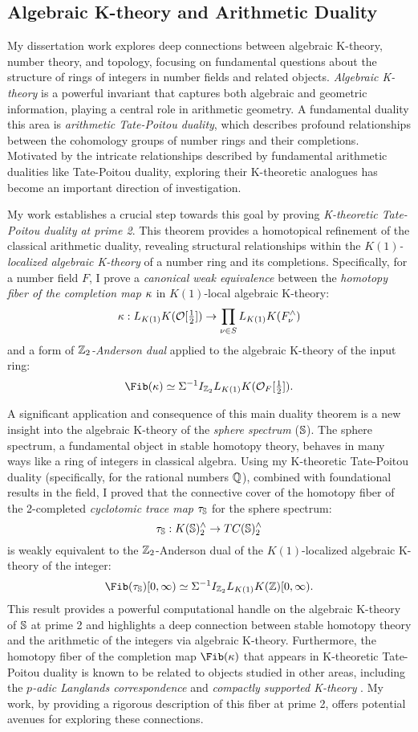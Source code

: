 \documentclass[11pt]{article}
\begin{document}
\subsection{Algebraic K-theory and Arithmetic Duality}
My dissertation work explores deep connections between algebraic K-theory, number theory, and topology, focusing on fundamental questions about the structure of rings of integers in number fields and related objects. {\it Algebraic K-theory} is a powerful invariant that captures both algebraic and geometric information, playing a central role in arithmetic geometry. A fundamental duality this area is {\it arithmetic Tate-Poitou duality}, which describes profound relationships between the cohomology groups of number rings and their completions. Motivated by the intricate relationships described by fundamental arithmetic dualities like Tate-Poitou duality, exploring their K-theoretic analogues has become an important direction of investigation.

My work \cite{Cho} establishes a crucial step towards this goal by proving {\it K-theoretic Tate-Poitou duality at prime 2}. This theorem provides a homotopical refinement of the classical arithmetic duality, revealing structural relationships within the {\it $K(1)$-localized algebraic K-theory} of a number ring and its completions. Specifically, for a number field $F$, I prove a {\it canonical weak equivalence} between the {\it homotopy fiber of the completion map} $\kappa$ in $K(1)$-local algebraic K-theory:
\[\kappa: L_{K(1)}K({\mathcal{O}}[\tfrac{1}{2}]) \to \prod_{\nu\in S} L_{K(1)}K (F_\nu^\wedge)\]
 and a form of {\it $\mathbb{Z}_2$-Anderson dual} applied to the algebraic K-theory of the input ring: 
\[\Fib(\ka) \simeq \SI^{-1} I_{\bZ_2} L_{K(1)}K(\calO_F[\tfrac{1}{2}]).\]

A significant application and consequence of this main duality theorem is a new insight into the algebraic K-theory of the {\it sphere spectrum} ($\mathbb{S}$). The sphere spectrum, a fundamental object in stable homotopy theory, behaves in many ways like a ring of integers in classical algebra. Using my K-theoretic Tate-Poitou duality (specifically, for the rational numbers $\mathbb{Q}$), combined with foundational results in the field, I proved that the connective cover of the homotopy fiber of the 2-completed {\it cyclotomic trace map} $\tau_{\mathbb{S}}$ for the sphere spectrum:
\[\tau_{\mathbb{S}}: K(\mathbb{S})_2^\wedge \to TC(\mathbb{S})_2^\wedge\]
 is weakly equivalent to the $\mathbb{Z}_2$-Anderson dual of the $K(1)$-localized algebraic K-theory of the integer: 
\[\Fib(\ta_\bS)[0,\infty) \simeq \SI^{-1}I_{\bZ_2} L_{K(1)} K(\bZ)[0,\infty).\] This result provides a powerful computational handle on the algebraic K-theory of $\mathbb{S}$ at prime 2 and highlights a deep connection between stable homotopy theory and the arithmetic of the integers via algebraic K-theory.
Furthermore, the homotopy fiber of the completion map $\Fib(\ka)$ that appears in K-theoretic Tate-Poitou duality is known to be related to objects studied in other areas, including the {\it $p$-adic Langlands correspondence} \cite{MR2905536} and {\it compactly supported K-theory} \cite{MR3211458}. My work, by providing a rigorous description of this fiber at prime 2, offers potential avenues for exploring these connections.
\end{document}
